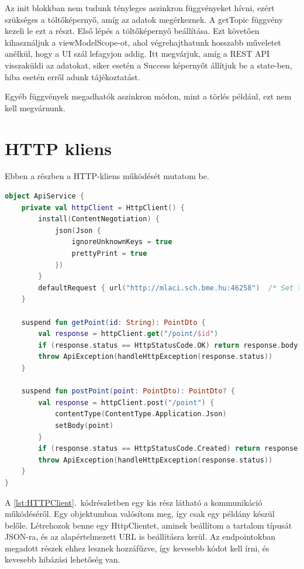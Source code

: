 Az init{} blokkban nem tudunk tényleges aszinkron függvényeket hívni, ezért szükséges a töltőképernyő, amíg az adatok megérkeznek.
A getTopic függvény kezeli le ezt a részt. Első lépés a töltőképernyő beállítása. Ezt követően kihasználjuk a viewModelScope-ot, ahol végrehajthatunk hosszabb műveletet anélkül, hogy a UI szál lefagyjon addig.
Itt megvárjuk, amíg a REST API visszaküldi az adatokat, siker esetén a Success képernyőt állítjuk be a state-ben, hiba esetén erről adunk tájékoztatást.

Egyéb függvények megadhatók aszinkron módon, mint a törlés például, ezt nem kell megvárnunk.

\section{HTTP kliens}
\label{sec:HTTP}

Ebben a részben a HTTP-kliens működését mutatom be.

\begin{lstlisting}[caption={HTTP kliens.}, label={lst:HTTPClient}, language=Kotlin]
object ApiService {
    private val httpClient = HttpClient() {
        install(ContentNegotiation) {
            json(Json {
                ignoreUnknownKeys = true
                prettyPrint = true
            })
        }
        defaultRequest { url("http://mlaci.sch.bme.hu:46258")  /* Set the base URL */ }
    }
    
    suspend fun getPoint(id: String): PointDto {
        val response = httpClient.get("/point/$id")
        if (response.status == HttpStatusCode.OK) return response.body()
        throw ApiException(handleHttpException(response.status))
    }

    suspend fun postPoint(point: PointDto): PointDto? {
        val response = httpClient.post("/point") {
            contentType(ContentType.Application.Json)
            setBody(point)
        }
        if (response.status == HttpStatusCode.Created) return response.body()
        throw ApiException(handleHttpException(response.status))
    }
}
\end{lstlisting}


A \ref{lst:HTTPClient}.~kódrészletben egy kis rész látható a kommunikáció működéséről.
Egy objektumban valósítom meg, így csak egy példány készül belőle.
Létrehozok benne egy HttpClientet, aminek beállítom a tartalom típusát JSON-ra, és az alapértelmezett URL is beállításra kerül. 
Az endpointokban megadott részek ehhez lesznek hozzáfűzve, így kevesebb kódot kell írni, és kevesebb hibázási lehetőség van.


